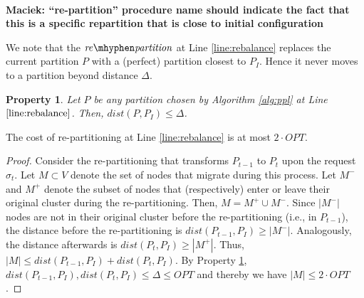 \documentclass[manuscript,screen=true]{acmart}
\newcommand{\OPT}{\mathit{OPT}}
\newtheorem{property}{Property}
\newcommand\maciek[1]{\color{brown}\textbf{\\ Maciek: #1}\color{black}}
\begin{document}
      \maciek{``re-partition'' procedure name should indicate the fact that this is a specific repartition that is close to initial configuration}


      We note that the $\mathit{re\mhyphen partition}$ at Line \ref{line:rebalance} replaces the current partition $P$ with a (perfect) partition closest to $P_I$.
Hence it never moves to a partition beyond distance $\Delta$.      
\begin{property} \label{prop:dist<OPT}
    Let $P$ be any partition chosen by Algorithm \ref{alg:ppl} at Line $\ref{line:rebalance}$.
    Then, $\mathit{dist}(P,P_I) \leq \Delta$.
\end{property}

\begin{lemma}	\label{lemma:rebalancecost}
    The cost of re-partitioning at Line \ref{line:rebalance} is at most $2\cdot\OPT$.
\end{lemma}
\begin{proof}
    Consider the re-partitioning that transforms $P_{t-1}$ to $P_t$ upon the request $\sigma_t$.
    Let $M \subset V$ denote the set of nodes that migrate during this process.
	Let $M^-$ and $M^+$ denote the subset of nodes that (respectively)
    enter or leave their original cluster during the re-partitioning.    
    Then,
    $M = M^+ \cup M^-$.
    Since $|M^-|$ nodes are not in their original cluster before the re-partitioning (i.e., in $P_{t-1}$),
    the distance before the re-partitioning is $\mathit{dist}(P_{t-1},P_I) \geq | M^-|$.
    Analogously,
     the distance afterwards is $\mathit{dist}(P_{t},P_I) \geq | M^+|$.
    Thus,
    $|M| \leq \mathit{dist}(P_{t-1},P_I) + \mathit{dist}(P_{t},P_I)$.
    By Property \ref{prop:dist<OPT},
    $\mathit{dist}(P_{t-1},P_I) , \mathit{dist}(P_{t},P_I) \leq \Delta \leq \OPT$
    and thereby we have	
    $|M| \leq 2\cdot\OPT$.
\end{proof}
\end{document}
